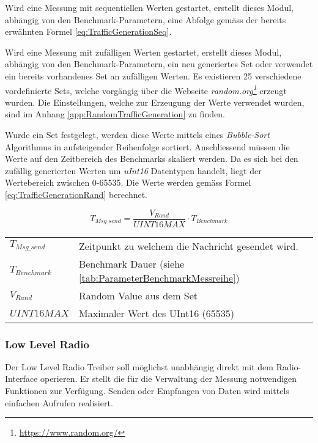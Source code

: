 Wird eine Messung mit sequentiellen Werten gestartet, erstellt dieses Modul, abhängig von den Benchmark-Parametern, eine Abfolge gemäss der bereits erwähnten Formel \ref{eq:TrafficGenerationSeq}.

Wird eine Messung mit zufälligen Werten gestartet, erstellt dieses Modul, abhängig von den Benchmark-Parametern, ein neu generiertes Set oder verwendet ein bereits vorhandenes Set an zufälligen Werten.
Es existieren 25 verschiedene vordefinierte Sets, welche vorgängig über die Webseite \textit{random.org\footnote{\url{https://www.random.org/}}} erzeugt wurden.
Die Einstellungen, welche zur Erzeugung der Werte verwendet wurden, sind im Anhang \ref{app:RandomTrafficGeneration} zu finden.

Wurde ein Set festgelegt, werden diese Werte mittels eines \textit{Bubble-Sort} Algorithmus in aufsteigender Reihenfolge sortiert.
Anschliessend müssen die Werte auf den Zeitbereich des Benchmarks skaliert werden.
Da es sich bei den zufällig generierten Werten um \textit{uInt16} Datentypen handelt, liegt der Wertebereich zwischen 0-65535.
Die Werte werden gemäss Formel \ref{eq:TrafficGenerationRand} berechnet. 

\begin{equation}\label{eq:TrafficGenerationRand}
T_{Msg\_send} =  \frac{V_{Rand}}{UINT16MAX} \cdot T_{Benchmark}
\end{equation}

\begin{small}
	\begin{center}
		\begin{tabular}{ll}
			$T_{Msg\_send}$ & Zeitpunkt zu welchem die Nachricht gesendet wird.\\
			$T_{Benchmark}$ & Benchmark Dauer (siehe \ref{tab:ParameterBenchmarkMessreihe})\\
			$V_{Rand}$ & Random Value aus dem Set \\
			$UINT16MAX$ & Maximaler Wert des UInt16 (65535) \\
		\end{tabular}
	\end{center}
\end{small}

\subsubsection{Low Level Radio}\label{subsubsec:LowLevelRadio}
Der Low Level Radio Treiber soll möglichst unabhängig direkt mit dem Radio-Interface operieren.
Er stellt die für die Verwaltung der Messung notwendigen Funktionen zur Verfügung.
Senden oder Empfangen von Daten wird mittels einfachen Aufrufen realisiert.

